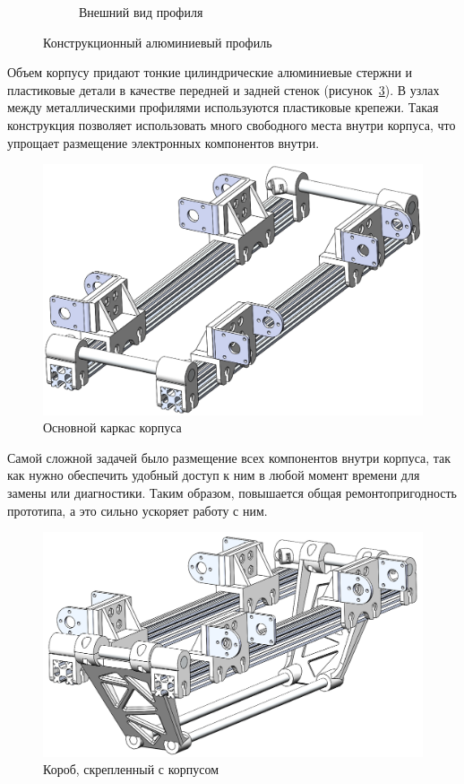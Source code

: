\begin{figure}[ht]
\begin{subfigure}[b]{0.45\textwidth}
        \caption{Внешний вид профиля}
    \end{subfigure}
     
    \caption{Конструкционный алюминиевый профиль}
    \label{fig:profile1}
\end{figure}

Объем корпусу придают тонкие цилиндрические алюминиевые стержни и пластиковые детали в качестве передней и задней стенок (рисунок~\ref{fig:korpus1}). В узлах между металлическими профилями используются пластиковые крепежи. Такая конструкция позволяет использовать много свободного места внутри корпуса, что упрощает размещение электронных компонентов внутри.

\begin{figure}[h]
    \centering
    \includegraphics[scale=0.55]{chapter_mechanics_construction/figure10.png}
    \caption{Основной каркас корпуса}
    \label{fig:karkas1}
\end{figure}

\newpage
Самой сложной задачей было размещение всех компонентов внутри корпуса, так как нужно обеспечить удобный доступ к ним в любой момент времени для замены или диагностики. Таким образом, повышается общая ремонтопригодность прототипа, а это сильно ускоряет работу с ним.

\begin{figure}[h]
    \centering
    \includegraphics[scale=0.57]{chapter_mechanics_construction/figure13.png}
    \caption{Короб, скрепленный с корпусом}
    \label{fig:korpus1}
\end{figure}

